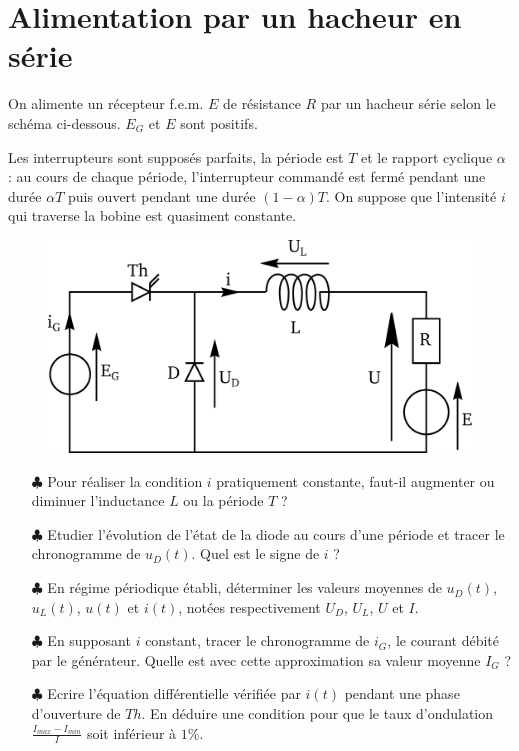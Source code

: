 \documentclass{report}
\begin{document}
\newpage

\section*{Alimentation par un hacheur en série}

On alimente un récepteur f.e.m. $E$ de résistance $R$ par un hacheur série selon le schéma ci-dessous. $E_{G}$ et $E$ sont positifs.

Les interrupteurs sont supposés parfaits, la période est $T$ et le rapport cyclique $\alpha$ : au cours de chaque période, l'interrupteur commandé est fermé pendant une durée $\alpha T$ puis ouvert pendant une durée $(1-\alpha)T$. On suppose que l'intensité $i$ qui traverse la bobine est quasiment constante.

\begin{figure}[h!]
	\centering
		\includegraphics[scale=0.4]{Hacheur_serie.pdf}
\end{figure}	

\begin{itemize}
	\item[$\clubsuit$] Pour réaliser la condition $i$ pratiquement constante, faut-il augmenter ou diminuer l'inductance $L$ ou la période $T$ ?
	\item[$\clubsuit$] Etudier l'évolution de l'état de la diode au cours d'une période et tracer le chronogramme de $u_{D}(t)$. Quel est le signe de $i$ ?
	\item[$\clubsuit$] En régime périodique établi, déterminer les valeurs moyennes de $u_{D}(t)$, $u_{L}(t)$, $u(t)$ et $i(t)$, notées respectivement $U_{D}$, $U_{L}$, $U$ et $I$.
	\item[$\clubsuit$] En supposant $i$ constant, tracer le chronogramme de $i_{G}$, le courant débité par le générateur. Quelle est avec cette approximation sa valeur moyenne $I_{G}$ ?
	\item[$\clubsuit$] Ecrire l'équation différentielle vérifiée par $i(t)$ pendant une phase d'ouverture de $Th$. En déduire une condition pour que le taux d'ondulation $\frac{I_{max}-I_{min}}{I}$ soit inférieur à $1\%$.
\end{itemize}
\end{document}
